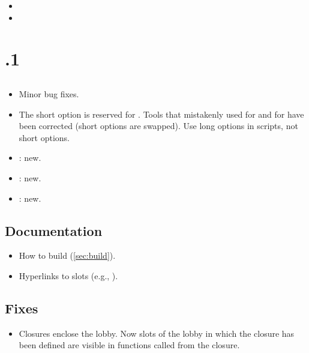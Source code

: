 \begin{itemize}
\item {}
\item {}
\end{itemize}

\section{.1}

\subsection{\us}
\begin{itemize}
\item Minor bug fixes.
\item The short option  is reserved for .
  Tools that mistakenly used  for  and
   for  have been corrected (short options are
  swapped).  Use long options in scripts, not short options.
\item {}: new.
\item {}: new.
\item {}: new.
\end{itemize}

\subsection{Documentation}

\begin{itemize}
\item How to build \usdk (\autoref{sec:build}).
\item Hyperlinks to slots (e.g., ).
\end{itemize}

\subsection{Fixes}
\begin{itemize}
\item Closures enclose the lobby.  Now slots of the lobby in which the
  closure has been defined are visible in functions called from the closure.
\end{itemize}

\section{}

